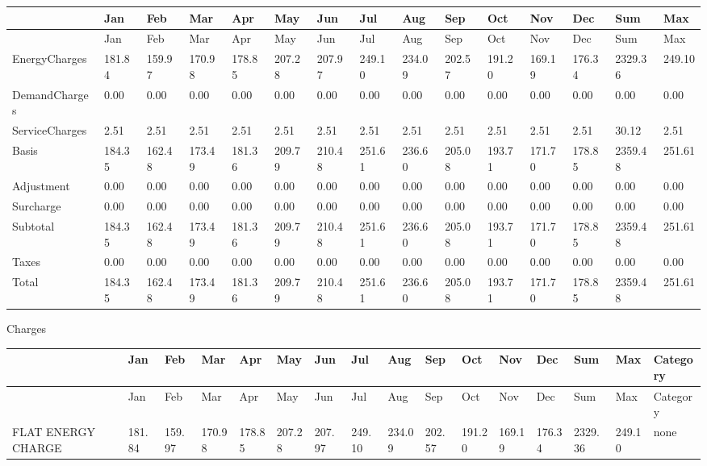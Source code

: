 {\tiny
\begin{longtable}[c]{>{\raggedright}p{0.4in}>{\raggedright}p{0.4in}>{\raggedright}p{0.4in}>{\raggedright}p{0.4in}>{\raggedright}p{0.4in}>{\raggedright}p{0.4in}>{\raggedright}p{0.4in}>{\raggedright}p{0.4in}>{\raggedright}p{0.4in}>{\raggedright}p{0.4in}>{\raggedright}p{0.4in}>{\raggedright}p{0.4in}>{\raggedright}p{0.4in}>{\raggedright}p{0.4in}>{\raggedright}p{0.4in}}
\toprule 
~ & Jan & Feb & Mar & Apr & May & Jun & Jul & Aug & Sep & Oct & Nov & Dec & Sum & Max \tabularnewline
\midrule
\endfirsthead

\toprule 
~ & Jan & Feb & Mar & Apr & May & Jun & Jul & Aug & Sep & Oct & Nov & Dec & Sum & Max \tabularnewline
\midrule
\endhead

EnergyCharges & 181.84 & 159.97 & 170.98 & 178.85 & 207.28 & 207.97 & 249.10 & 234.09 & 202.57 & 191.20 & 169.19 & 176.34 & 2329.36 & 249.10 \tabularnewline
DemandCharges & 0.00 & 0.00 & 0.00 & 0.00 & 0.00 & 0.00 & 0.00 & 0.00 & 0.00 & 0.00 & 0.00 & 0.00 & 0.00 & 0.00 \tabularnewline
ServiceCharges & 2.51 & 2.51 & 2.51 & 2.51 & 2.51 & 2.51 & 2.51 & 2.51 & 2.51 & 2.51 & 2.51 & 2.51 & 30.12 & 2.51 \tabularnewline
Basis & 184.35 & 162.48 & 173.49 & 181.36 & 209.79 & 210.48 & 251.61 & 236.60 & 205.08 & 193.71 & 171.70 & 178.85 & 2359.48 & 251.61 \tabularnewline
Adjustment & 0.00 & 0.00 & 0.00 & 0.00 & 0.00 & 0.00 & 0.00 & 0.00 & 0.00 & 0.00 & 0.00 & 0.00 & 0.00 & 0.00 \tabularnewline
Surcharge & 0.00 & 0.00 & 0.00 & 0.00 & 0.00 & 0.00 & 0.00 & 0.00 & 0.00 & 0.00 & 0.00 & 0.00 & 0.00 & 0.00 \tabularnewline
Subtotal & 184.35 & 162.48 & 173.49 & 181.36 & 209.79 & 210.48 & 251.61 & 236.60 & 205.08 & 193.71 & 171.70 & 178.85 & 2359.48 & 251.61 \tabularnewline
Taxes & 0.00 & 0.00 & 0.00 & 0.00 & 0.00 & 0.00 & 0.00 & 0.00 & 0.00 & 0.00 & 0.00 & 0.00 & 0.00 & 0.00 \tabularnewline
Total & 184.35 & 162.48 & 173.49 & 181.36 & 209.79 & 210.48 & 251.61 & 236.60 & 205.08 & 193.71 & 171.70 & 178.85 & 2359.48 & 251.61 \tabularnewline
\bottomrule
\end{longtable}}

Charges

{\tiny
\begin{longtable}[c]{>{\raggedright}p{0.37in}>{\raggedright}p{0.37in}>{\raggedright}p{0.37in}>{\raggedright}p{0.37in}>{\raggedright}p{0.37in}>{\raggedright}p{0.37in}>{\raggedright}p{0.37in}>{\raggedright}p{0.37in}>{\raggedright}p{0.37in}>{\raggedright}p{0.37in}>{\raggedright}p{0.37in}>{\raggedright}p{0.37in}>{\raggedright}p{0.37in}>{\raggedright}p{0.37in}>{\raggedright}p{0.37in}>{\raggedright}p{0.37in}}
\toprule 
~ & Jan & Feb & Mar & Apr & May & Jun & Jul & Aug & Sep & Oct & Nov & Dec & Sum & Max & Category \tabularnewline
\midrule
\endfirsthead

\toprule 
~ & Jan & Feb & Mar & Apr & May & Jun & Jul & Aug & Sep & Oct & Nov & Dec & Sum & Max & Category \tabularnewline
\midrule
\endhead

FLAT ENERGY CHARGE & 181.84 & 159.97 & 170.98 & 178.85 & 207.28 & 207.97 & 249.10 & 234.09 & 202.57 & 191.20 & 169.19 & 176.34 & 2329.36 & 249.10 & none \tabularnewline
\bottomrule
\end{longtable}}

